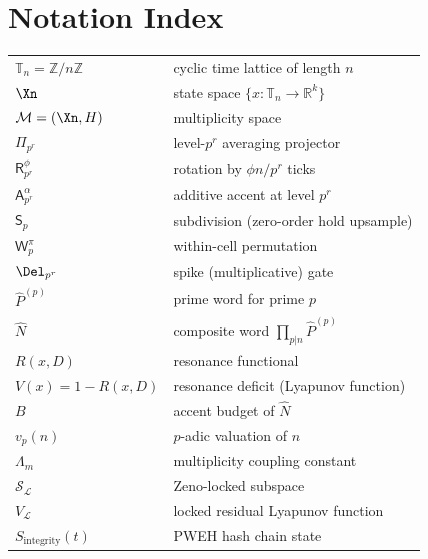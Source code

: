 \documentclass[11pt]{amsart}
\newcommand{\M}{\mathcal{M}}
\newcommand{\Prj}{\Pi}
\newcommand{\Sp}{\mathsf{S}}
\newcommand{\Ap}{\mathsf{A}}
\newcommand{\Rp}{\mathsf{R}}
\newcommand{\Wp}{\mathsf{W}}
\newcommand{\bN}{\widehat{N}}
\newcommand{\vp}{v_p}
\newcommand{\R}{\mathbb{R}}
\newcommand{\Z}{\mathbb{Z}}
\newcommand{\Tn}{\mathbb{T}_n}
\begin{document}
\section*{Notation Index}

\begin{center}
\begin{tabular}{ll}
$\Tn = \Z/n\Z$ & cyclic time lattice of length $n$ \\
$\Xn$ & state space $\{x : \Tn \to \R^k\}$ \\
$\M = (\Xn, H)$ & multiplicity space \\
$\Prj_{p^r}$ & level-$p^r$ averaging projector \\
$\Rp^\phi_{p^r}$ & rotation by $\phi n/p^r$ ticks \\
$\Ap^\alpha_{p^r}$ & additive accent at level $p^r$ \\
$\Sp_p$ & subdivision (zero-order hold upsample) \\
$\Wp^\pi_p$ & within-cell permutation \\
$\Del_{p^r}$ & spike (multiplicative) gate \\
$\hat{P}^{(p)}$ & prime word for prime $p$ \\
$\bN$ & composite word $\prod_{p|n}\hat{P}^{(p)}$ \\
$R(x,D)$ & resonance functional \\
$V(x) = 1 - R(x,D)$ & resonance deficit (Lyapunov function) \\
$B$ & accent budget of $\bN$ \\
$\vp(n)$ & $p$-adic valuation of $n$ \\
$\Lambda_m$ & multiplicity coupling constant \\
$\mathcal{S}_{\mathcal{L}}$ & Zeno-locked subspace \\
$V_{\mathcal{L}}$ & locked residual Lyapunov function \\
$S_{\mathrm{integrity}}(t)$ & PWEH hash chain state \\
\end{tabular}
\end{center}


\nocite{*}
  

\end{document}
